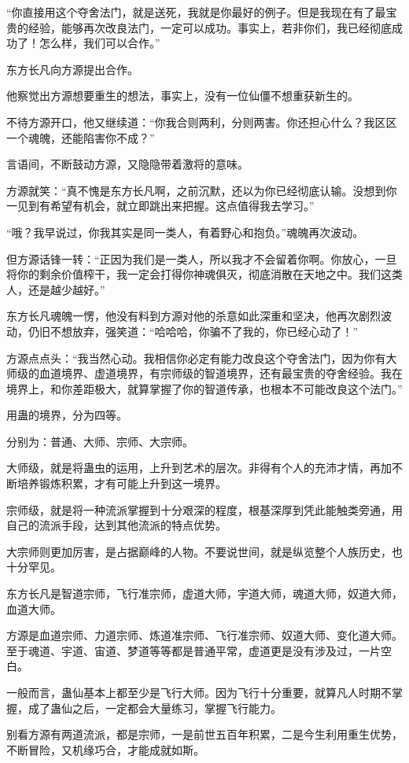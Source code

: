 \begin{this_body}
“你直接用这个夺舍法门，就是送死，我就是你最好的例子。但是我现在有了最宝贵的经验，能够再次改良法门，一定可以成功。事实上，若非你们，我已经彻底成功了！怎么样，我们可以合作。”

东方长凡向方源提出合作。

他察觉出方源想要重生的想法，事实上，没有一位仙僵不想重获新生的。

不待方源开口，他又继续道：“你我合则两利，分则两害。你还担心什么？我区区一个魂魄，还能陷害你不成？”

言语间，不断鼓动方源，又隐隐带着激将的意味。

方源就笑：“真不愧是东方长凡啊，之前沉默，还以为你已经彻底认输。没想到你一见到有希望有机会，就立即跳出来把握。这点值得我去学习。”

“哦？我早说过，你我其实是同一类人，有着野心和抱负。”魂魄再次波动。

但方源话锋一转：“正因为我们是一类人，所以我才不会留着你啊。你放心，一旦将你的剩余价值榨干，我一定会打得你神魂俱灭，彻底消散在天地之中。我们这类人，还是越少越好。”

东方长凡魂魄一愣，他没有料到方源对他的杀意如此深重和坚决，他再次剧烈波动，仍旧不想放弃，强笑道：“哈哈哈，你骗不了我的，你已经心动了！”

方源点点头：“我当然心动。我相信你必定有能力改良这个夺舍法门，因为你有大师级的血道境界、虚道境界，有宗师级的智道境界，还有最宝贵的夺舍经验。我在境界上，和你差距极大，就算掌握了你的智道传承，也根本不可能改良这个法门。”

用蛊的境界，分为四等。

分别为：普通、大师、宗师、大宗师。

大师级，就是将蛊虫的运用，上升到艺术的层次。非得有个人的充沛才情，再加不断培养锻炼积累，才有可能上升到这一境界。

宗师级，就是将一种流派掌握到十分艰深的程度，根基深厚到凭此能触类旁通，用自己的流派手段，达到其他流派的特点优势。

大宗师则更加厉害，是占据巅峰的人物。不要说世间，就是纵览整个人族历史，也十分罕见。

东方长凡是智道宗师，飞行准宗师，虚道大师，宇道大师，魂道大师，奴道大师，血道大师。

方源是血道宗师、力道宗师、炼道准宗师、飞行准宗师、奴道大师、变化道大师。至于魂道、宇道、宙道、梦道等等都是普通平常，虚道更是没有涉及过，一片空白。

一般而言，蛊仙基本上都至少是飞行大师。因为飞行十分重要，就算凡人时期不掌握，成了蛊仙之后，一定都会大量练习，掌握飞行能力。

别看方源有两道流派，都是宗师，一是前世五百年积累，二是今生利用重生优势，不断冒险，又机缘巧合，才能成就如斯。


\end{this_body}
